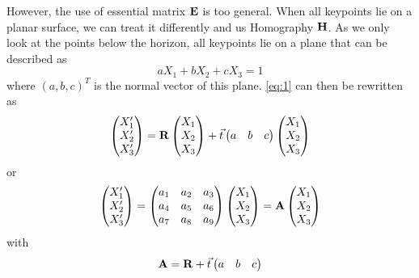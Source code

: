 However, the use of essential matrix $\mathbf{E}$ is too general. When all keypoints lie on a planar surface, we can treat it differently and us Homography $\mathbf{H}$. As we only look at the points below the horizon, all keypoints lie on a plane that can be described as
\begin{equation}
    aX_1 + bX_2 + cX_3 = 1
\end{equation}
where $(a, b, c)^T$ is the normal vector of this plane. \autoref{eq:1} can then be rewritten as 
\begin{equation}
    \begin{pmatrix}
        X_1' \\
        X_2' \\
        X_3'
    \end{pmatrix} = \mathbf{R}
    \begin{pmatrix}
        X_1 \\
        X_2 \\
        X_3
    \end{pmatrix} + \vec t
    \begin{pmatrix}
        a & b & c
    \end{pmatrix}
    \begin{pmatrix}
        X_1 \\
        X_2 \\
        X_3
    \end{pmatrix}
\end{equation}
or
\begin{equation}
    \begin{pmatrix}
        X_1' \\
        X_2' \\
        X_3'
    \end{pmatrix} =
    \begin{pmatrix}
        a_1 & a_2 & a_3 \\
        a_4 & a_5 & a_6 \\
        a_7 & a_8 & a_9 \\
    \end{pmatrix}
    \begin{pmatrix}
        X_1 \\
        X_2 \\
        X_3
    \end{pmatrix} = \mathbf{A}
    \begin{pmatrix}
        X_1 \\
        X_2 \\
        X_3
    \end{pmatrix}
\end{equation}
with
\begin{equation} \label{eq:matrixA}
    \mathbf{A} = \mathbf{R} + \vec t
    \begin{pmatrix}
        a & b & c
    \end{pmatrix}
\end{equation}

